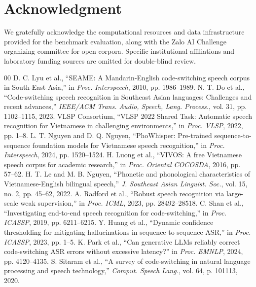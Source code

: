 \documentclass[9pt, conference, a4paper, compsocconf]{IEEEtran}
\begin{document}
\section*{Acknowledgment}
We gratefully acknowledge the computational resources and data infrastructure provided for the benchmark evaluation, along with the Zalo AI Challenge organizing committee for open corpora. Specific institutional affiliations and laboratory funding sources are omitted for double-blind review.

\begin{thebibliography}{00}
 D. C. Lyu et al., ``SEAME: A Mandarin-English code-switching speech corpus in South-East Asia,'' in \textit{Proc. Interspeech}, 2010, pp. 1986--1989.
 N. T. Do et al., ``Code-switching speech recognition in Southeast Asian languages: Challenges and recent advances,'' \textit{IEEE/ACM Trans. Audio, Speech, Lang. Process.}, vol. 31, pp. 1102--1115, 2023.
 VLSP Consortium, ``VLSP 2022 Shared Task: Automatic speech recognition for Vietnamese in challenging environments,'' in \textit{Proc. VLSP}, 2022, pp. 1--8.
 L. T. Nguyen and D. Q. Nguyen, ``PhoWhisper: Pre-trained sequence-to-sequence foundation models for Vietnamese speech recognition,'' in \textit{Proc. Interspeech}, 2024, pp. 1520--1524.
 H. Luong et al., ``VIVOS: A free Vietnamese speech corpus for academic research,'' in \textit{Proc. Oriental COCOSDA}, 2016, pp. 57--62.
 H. T. Le and M. B. Nguyen, ``Phonetic and phonological characteristics of Vietnamese-English bilingual speech,'' \textit{J. Southeast Asian Linguist. Soc.}, vol. 15, no. 2, pp. 45--62, 2022.
 A. Radford et al., ``Robust speech recognition via large-scale weak supervision,'' in \textit{Proc. ICML}, 2023, pp. 28492--28518.
 C. Shan et al., ``Investigating end-to-end speech recognition for code-switching,'' in \textit{Proc. ICASSP}, 2019, pp. 6211--6215.
 Y. Huang et al., ``Dynamic confidence thresholding for mitigating hallucinations in sequence-to-sequence ASR,'' in \textit{Proc. ICASSP}, 2023, pp. 1--5.
 K. Park et al., ``Can generative LLMs reliably correct code-switching ASR errors without excessive latency?'' in \textit{Proc. EMNLP}, 2024, pp. 4120--4135.
 S. Sitaram et al., ``A survey of code-switching in natural language processing and speech technology,'' \textit{Comput. Speech Lang.}, vol. 64, p. 101113, 2020.

\end{thebibliography}
\end{document}
